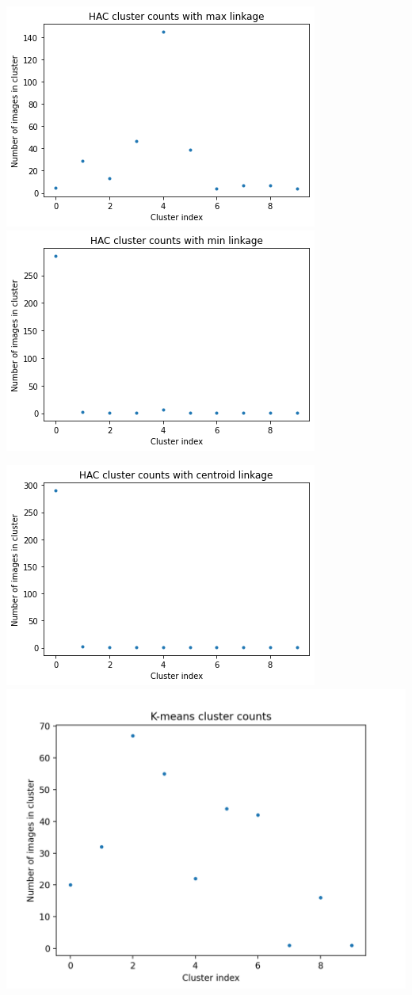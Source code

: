 \documentclass[submit]{harvardml}
\begin{document}
\includegraphics[scale=0.5]{plots/hacmax-clusters.png} \
\includegraphics[scale=0.5]{plots/hacmin-clusters.png}

\includegraphics[scale=0.5]{plots/haccentroid-clusters.png} \
\includegraphics[scale=0.44]{plots/kmeans-clusters.png}
\end{document}
